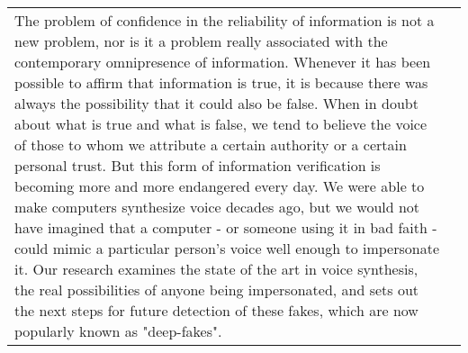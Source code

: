 \begin{center}
\begin{tabularx}{1\textwidth} { 
  | >{\raggedleft\arraybackslash}X
  | >{\raggedright\arraybackslash}X | }
\hline

\multicolumn{2}{|c|}{Abstract}\\
\hline

\multicolumn{2}{|X|}
{
The problem of confidence in the reliability of information is not a new problem, nor is it a problem really associated with the contemporary omnipresence of information. Whenever it has been possible to affirm that information is true, it is because there was always the possibility that it could also be false.
\newline\newline
When in doubt about what is true and what is false, we tend to believe the voice of those to whom we attribute a certain authority or a certain personal trust. But this form of information verification is becoming more and more endangered every day.
\newline\newline
We were able to make computers synthesize voice decades ago, but we would not have imagined that a computer - or someone using it in bad faith - could mimic a particular person's voice well enough to impersonate it.
\newline\newline
Our research examines the state of the art in voice synthesis, the real possibilities of anyone being impersonated, and sets out the next steps for future detection of these fakes, which are now popularly known as "deep-fakes".
} \\

\hline

\end{tabularx}
\end{center}


\restoregeometry
\newpage